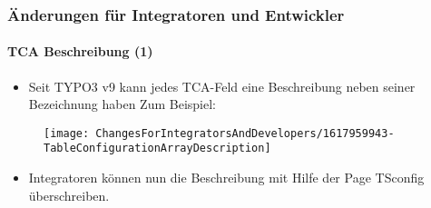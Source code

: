 %

\begin{frame}[fragile]
	\frametitle{Änderungen für Integratoren und Entwickler}
	\framesubtitle{TCA Beschreibung (1)}

	\begin{itemize}
		\item Seit TYPO3 v9 kann jedes TCA-Feld eine Beschreibung neben seiner Bezeichnung
			haben\newline
			Zum Beispiel:
	\end{itemize}
	\begin{figure}
		\texttt{[image: ChangesForIntegratorsAndDevelopers/1617959943-TableConfigurationArrayDescription]}
	\end{figure}
	\vspace{-0.4cm}
	\begin{itemize}
		\item Integratoren können nun die Beschreibung mit Hilfe der Page TSconfig überschreiben.
	\end{itemize}
\end{frame}


